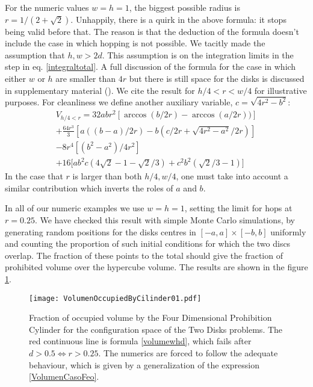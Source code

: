 \documentclass[a4paper,10pt, jcp, aps, preprint]{revtex4-1}
\begin{document}
For the numeric values $w=h=1$, the biggest possible radius is 
$r=1/(2+\sqrt{2})$. Unhappily, there is a quirk in the above formula:
it stops being valid before that. The reason is that the deduction
of the formula doesn't include the case in which hopping is not possible. 
We tacitly made the assumption that $h,w>2d$.  This assumption is on 
the integration limits in the step in eq. \ref{integraltotal}. 
A full discussion of the formula for the case in which either
$w$ or $h$ are smaller than $4r$ but there is still space for
the disks is discussed in supplementary material \cite{notascalculokarel}
(). 
We cite the  result for $h/4  <r< w/4$ for illustrative purposes.
For cleanliness we define another auxiliary variable,
$c=\sqrt{4r^2-b^2}$:
\begin{multline}\label{VolumenCasoFeo}
V_{h/4<r} = 32abr^2[\arccos(b/2r)-\arccos(a/2r))]\\
+\frac{64 r^3}{3 }[a((b-a)/2r)-b(c/2r+\sqrt{4r^2-a^2}/2r)]\\
-8r^4 [ (b^2-a^2)/4r^2]\\ 
+16[ a b^2 c (4\sqrt{2}-1-\sqrt{2}/3)
+c^2b^2 (\sqrt{2}/3-1) \big]
\end{multline}
In the case that $r$ is larger than both $h/4, w/4$, one must take
into account a similar
contribution which inverts the roles of $a$ and $b$.

In all of our numeric examples we use $w=h=1$, setting the
limit for hops at $r=0.25$. %
We have checked this result with simple Monte Carlo simulations, 
by generating random positions for the disks centres in 
$[-a,a] \times [-b,b]$ uniformly and 
counting the proportion of such initial conditions for 
which the two discs overlap. The fraction of these points to the 
total should give the fraction of prohibited volume over the hypercube
volume. The results are shown in the figure \ref{VolMonteC}.

\begin{figure}[h]
\centering
\texttt{[image: VolumenOccupiedByCilinder01.pdf]}
\caption{Fraction of occupied volume by the 
Four Dimensional Prohibition Cylinder for the configuration space of the 
Two Disks problems. The red continuous line is formula \ref{volumewhd}, 
which fails after $d>0.5\Leftrightarrow r>0.25$. The numerics
 are forced to follow the adequate behaviour, which is given
by a generalization of the expression \ref{VolumenCasoFeo}. 
 }\label{VolMonteC}
\end{figure}
\end{document}
